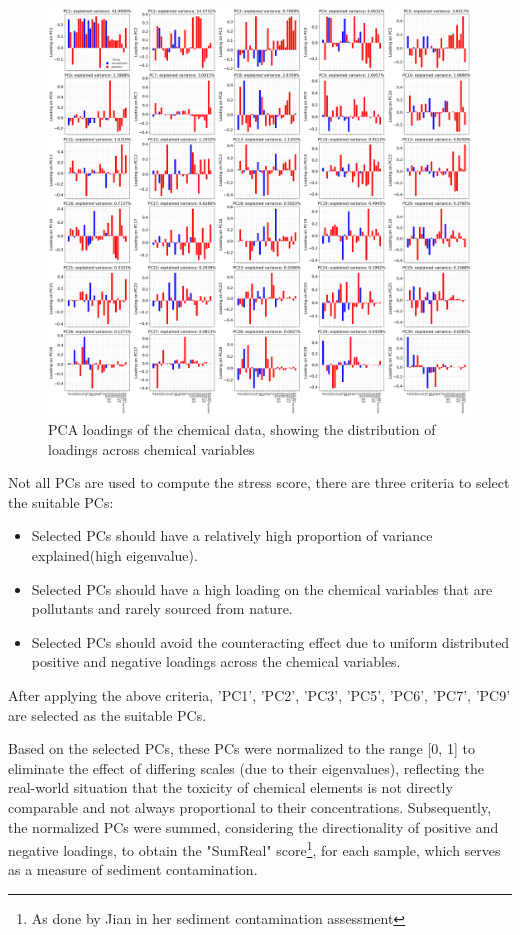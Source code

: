 \begin{figure}[!h]
\centering
\includegraphics[width=\textwidth]{../results/preliminary_results/pca_loadings_chemical_updated.png}
\caption{PCA loadings of the chemical data, showing the distribution of loadings across chemical variables}
\label{fig:pca_loadings_chemical_updated}
\end{figure}

Not all PCs are used to compute the stress score, there are three criteria to select the suitable PCs:

\begin{itemize}
    \item Selected PCs should have a relatively high proportion of variance explained(high eigenvalue).
    \item Selected PCs should have a high loading on the chemical variables that are pollutants and rarely sourced from nature.
    \item Selected PCs should avoid the counteracting effect due to uniform distributed positive and negative loadings
    across the chemical variables.
\end{itemize}

After applying the above criteria, 'PC1', 'PC2', 'PC3', 'PC5', 'PC6', 'PC7', 'PC9' are selected as the suitable PCs.

Based on the selected PCs, these PCs were normalized to the range [0, 1] to eliminate the effect of differing scales
(due to their eigenvalues), reflecting the real-world situation that the toxicity of chemical elements is
not directly comparable and not always proportional to their concentrations. Subsequently,
the normalized PCs were summed, considering the directionality of positive and negative loadings,
to obtain the "SumReal" score\footnote{As done by Jian in her sediment contamination assessment}, 
for each sample, which serves as a measure of sediment contamination.

